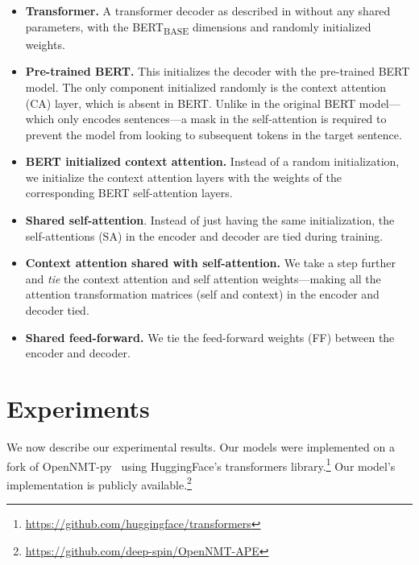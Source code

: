 \begin{itemize}
    \item \textbf{Transformer.} A transformer decoder as described in
          \citet{vaswani2017attention} without any shared parameters,
          with the BERT\textsubscript{\textsc{BASE}} dimensions and randomly
          initialized weights.
    \item \textbf{Pre-trained BERT.} This initializes the decoder with
          the pre-trained BERT model. The only component initialized randomly
          is the context attention (CA) layer, which is absent in BERT. Unlike
          in the original BERT model---which only encodes sentences---a mask in
          the self-attention is required to prevent the model from looking to
          subsequent tokens in the target sentence.
    \item \textbf{ BERT initialized context attention.} Instead of a
          random initialization, we initialize the context attention layers
          with the weights of the corresponding BERT self-attention layers.
    \item \textbf{Shared self-attention}. Instead of just having the same
          initialization, the self-attentions (SA) in the encoder and decoder
          are tied during training.
    \item \textbf{Context attention shared with self-attention.} We take
          a step further and \emph{tie} the context attention and self
          attention weights---making all the attention transformation matrices
          (self and context) in the encoder and decoder tied.
    \item \textbf{Shared feed-forward.} We tie the feed-forward weights
          (FF) between the encoder and decoder.
\end{itemize}

\section{Experiments} \label{sec:experiments}

We now describe our experimental results. Our models were implemented
on a fork of OpenNMT-py~\citep{klein2017opennmt} using HuggingFace's
transformers
library.\footnote{\url{https://github.com/huggingface/transformers}}
Our model's implementation is publicly
available.\footnote{\url{https://github.com/deep-spin/OpenNMT-APE}}

